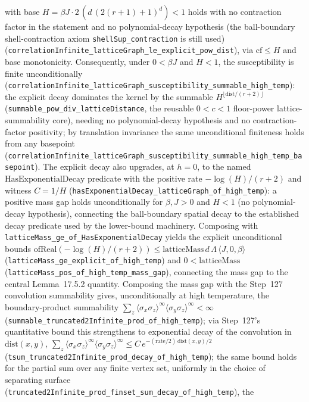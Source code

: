 \documentclass[a4paper,11pt]{article}
\begin{document}
with base \(H=\beta J\cdot2\,(d\,(2(r+1)+1)^d)<1\) holds with no contraction
factor in the statement and no polynomial-decay hypothesis (the ball-boundary
shell-contraction axiom \texttt{shellSup\_contraction} is still used)
(\texttt{correlationInfinite\_latticeGraph\_le\_explicit\_pow\_dist}), via
\(\text{cf}\le H\) and base monotonicity.  Consequently, under \(0<\beta J\) and
\(H<1\), the susceptibility is finite unconditionally
(\texttt{correlationInfinite\_latticeGraph\_susceptibility\_summable\_high\_temp}):
the explicit decay dominates the kernel by the summable \(H^{\lfloor\mathrm{dist}/(r+2)\rfloor}\)
(\texttt{summable\_pow\_div\_latticeDistance}, the reusable \(0<c<1\) floor-power
lattice-summability core), needing no polynomial-decay hypothesis and no
contraction-factor positivity; by translation invariance the same unconditional
finiteness holds from any basepoint
(\texttt{correlationInfinite\_latticeGraph\_susceptibility\_summable\_high\_temp\_basepoint}).
The explicit decay also upgrades, at \(h=0\), to the named
\(\mathrm{HasExponentialDecay}\) predicate with the positive rate
\(-\log(H)/(r+2)\) and witness \(C=1/H\)
(\texttt{hasExponentialDecay\_latticeGraph\_of\_high\_temp}): a positive mass gap
holds unconditionally for \(\beta,J>0\) and \(H<1\) (no polynomial-decay
hypothesis), connecting the ball-boundary spatial decay to the established decay
predicate used by the lower-bound machinery.  Composing with
\texttt{latticeMass\_ge\_of\_HasExponentialDecay} yields the explicit
unconditional bounds
\(\mathrm{ofReal}(-\log(H)/(r+2))\le\mathrm{latticeMass}\,d\,\Lambda\,\langle J,0,\beta\rangle\)
(\texttt{latticeMass\_ge\_explicit\_of\_high\_temp}) and
\(0<\mathrm{latticeMass}\) (\texttt{latticeMass\_pos\_of\_high\_temp\_mass\_gap}),
connecting the mass gap to the central Lemma~17.5.2 quantity.  Composing the mass
gap with the Step~127 convolution summability gives, unconditionally at high
temperature, the boundary-product summability
\(\sum_z\langle\sigma_x\sigma_z\rangle^\infty\langle\sigma_y\sigma_z\rangle^\infty<\infty\)
(\texttt{summable\_truncated2Infinite\_prod\_of\_high\_temp}); via Step~127's
quantitative bound this strengthens to exponential decay of the convolution in
\(\mathrm{dist}(x,y)\),
\(\sum_z\langle\sigma_x\sigma_z\rangle^\infty\langle\sigma_y\sigma_z\rangle^\infty
\le C\,e^{-(\mathrm{rate}/2)\,\mathrm{dist}(x,y)/2}\)
(\texttt{tsum\_truncated2Infinite\_prod\_decay\_of\_high\_temp}); the same bound
holds for the partial sum over any finite vertex set, uniformly in the choice of
separating surface
(\texttt{truncated2Infinite\_prod\_finset\_sum\_decay\_of\_high\_temp}), the
\end{document}
